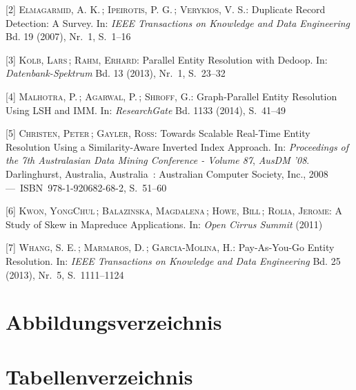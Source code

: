 \documentclass[%
	paper=A4,					%
	twoside=true,				%
	openright,					%
	parskip=full,				%
	chapterprefix=true,			%
	11pt,						%
	headings=normal,			%
	bibliography=totoc,			%
	listof=totoc,				%
	titlepage=on,				%
	captions=tableabove,		%
	draft=false,				%
]{scrreprt}%
\newcommand*\listoflistings{\listof{codelisting}{List of Listings}}
\begin{document}
\hypertarget{ref-elmagarmid_duplicate_2007}{}
{[}2{]} \textsc{Elmagarmid, A. K.} ; \textsc{Ipeirotis, P. G.} ;
\textsc{Verykios, V. S.}: Duplicate Record Detection: A Survey. In:
\emph{IEEE Transactions on Knowledge and Data Engineering} Bd. 19
(2007), Nr.~1, S.~1--16

\hypertarget{ref-kolb_parallel_2013}{}
{[}3{]} \textsc{Kolb, Lars} ; \textsc{Rahm, Erhard}: Parallel Entity
Resolution with Dedoop. In: \emph{Datenbank-Spektrum} Bd. 13 (2013),
Nr.~1, S.~23--32

\hypertarget{ref-malhotra_graph-parallel_2014}{}
{[}4{]} \textsc{Malhotra, P.} ; \textsc{Agarwal, P.} ; \textsc{Shroff,
G.}: Graph-Parallel Entity Resolution Using LSH and IMM. In:
\emph{ResearchGate} Bd. 1133 (2014), S.~41--49

\hypertarget{ref-christen_towards_2008}{}
{[}5{]} \textsc{Christen, Peter} ; \textsc{Gayler, Ross}: Towards
Scalable Real-Time Entity Resolution Using a Similarity-Aware Inverted
Index Approach. In: \emph{Proceedings of the 7th Australasian Data
Mining Conference - Volume 87}, \emph{AusDM '08}. Darlinghurst,
Australia, Australia~: Australian Computer Society, Inc., 2008
---~ISBN~978-1-920682-68-2, S.~51--60

\hypertarget{ref-kwon_study_2011}{}
{[}6{]} \textsc{Kwon, YongChul} ; \textsc{Balazinska, Magdalena} ;
\textsc{Howe, Bill} ; \textsc{Rolia, Jerome}: A Study of Skew in
Mapreduce Applications. In: \emph{Open Cirrus Summit} (2011)

\hypertarget{ref-whang_pay-as-you-go_2013}{}
{[}7{]} \textsc{Whang, S. E.} ; \textsc{Marmaros, D.} ;
\textsc{Garcia-Molina, H.}: Pay-As-You-Go Entity Resolution. In:
\emph{IEEE Transactions on Knowledge and Data Engineering} Bd. 25
(2013), Nr.~5, S.~1111--1124

\cleardoublepage


\chapter*{Abbildungsverzeichnis}\label{abbildungsverzeichnis}
\makeatletter
{}%
\makeatother
\blindtext
\cleardoublepage

\listoflistings

\chapter*{Tabellenverzeichnis}\label{tabellenverzeichnis}
\makeatletter
{}%
\makeatother
\cleardoublepage


\cleardoublepage


\clearpage
\newpage
\mbox{}

\end{document}
